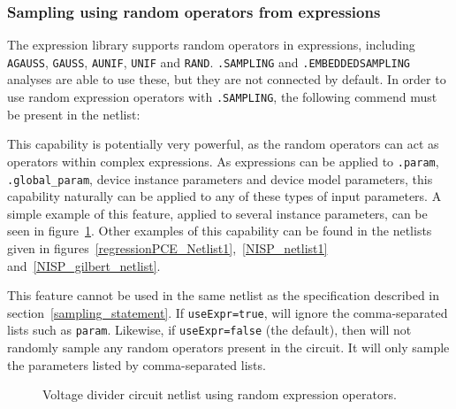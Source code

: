 \subsubsection{Sampling using random operators from expressions}

The \Xyce{} expression library supports random operators in expressions, 
including \texttt{AGAUSS}, \texttt{GAUSS}, \texttt{AUNIF}, \texttt{UNIF} and \texttt{RAND}.
\Xyce{} \texttt{.SAMPLING} and \texttt{.EMBEDDEDSAMPLING} analyses are able to use these, but they are not
connected by default.  In order to use random expression operators with \texttt{.SAMPLING}, 
the following commend must be present in the netlist:

This capability is potentially very powerful, as the random operators can 
act as operators within complex expressions.  
As expressions can be applied to \texttt{.param}, \texttt{.global\_param}, 
device instance parameters  and device model parameters, this capability 
naturally can be applied to any of these types of input parameters.
A simple example of this feature, applied to several instance parameters, 
can be seen in figure~\ref{Sampling_Netlist_4}.  Other examples of this capability can be found 
in the netlists given in figures~\ref{regressionPCE_Netlist1},~\ref{NISP_netlist1} 
and~\ref{NISP_gilbert_netlist}.

This feature cannot be used in the same netlist as the 
specification described in section~\ref{sampling_statement}.  If 
\texttt{useExpr=true}, \Xyce{} will ignore the comma-separated lists such as 
\texttt{param}.  Likewise, if \texttt{useExpr=false} (the default), then 
\Xyce{} will not randomly sample any random operators present in the circuit.  
It will only sample the parameters listed by comma-separated lists.

\begin{figure}[htbp]
  \fontsize{9pt}{10pt}
\begin{centering}
\caption{Voltage divider circuit netlist using random expression operators.
\label{Sampling_Netlist_4}}
\end{centering}
\end{figure}


